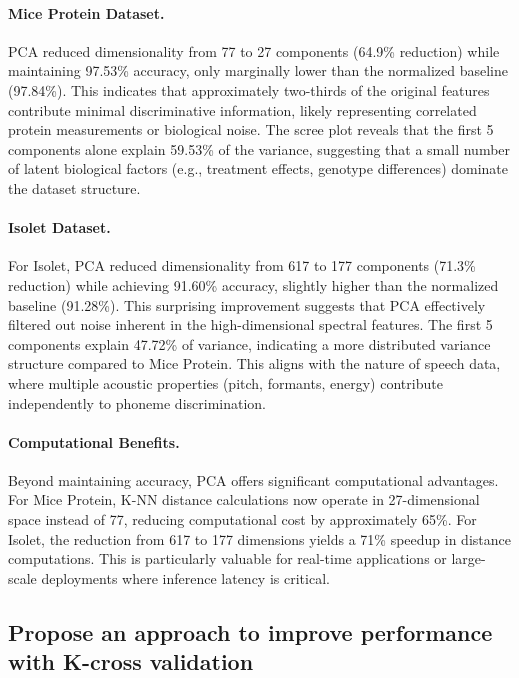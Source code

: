\documentclass[12pt]{article}
\begin{document}
\paragraph{Mice Protein Dataset.} PCA reduced dimensionality from 77 to 27 components (64.9\% reduction) while maintaining 97.53\% accuracy, only marginally lower than the normalized baseline (97.84\%). This indicates that approximately two-thirds of the original features contribute minimal discriminative information, likely representing correlated protein measurements or biological noise. The scree plot reveals that the first 5 components alone explain 59.53\% of the variance, suggesting that a small number of latent biological factors (e.g., treatment effects, genotype differences) dominate the dataset structure.

\paragraph{Isolet Dataset.} For Isolet, PCA reduced dimensionality from 617 to 177 components (71.3\% reduction) while achieving 91.60\% accuracy, slightly higher than the normalized baseline (91.28\%). This surprising improvement suggests that PCA effectively filtered out noise inherent in the high-dimensional spectral features. The first 5 components explain 47.72\% of variance, indicating a more distributed variance structure compared to Mice Protein. This aligns with the nature of speech data, where multiple acoustic properties (pitch, formants, energy) contribute independently to phoneme discrimination.

\paragraph{Computational Benefits.} Beyond maintaining accuracy, PCA offers significant computational advantages. For Mice Protein, K-NN distance calculations now operate in 27-dimensional space instead of 77, reducing computational cost by approximately 65\%. For Isolet, the reduction from 617 to 177 dimensions yields a 71\% speedup in distance computations. This is particularly valuable for real-time applications or large-scale deployments where inference latency is critical.

\subsection{Propose an approach to improve performance with K-cross validation}
\end{document}
